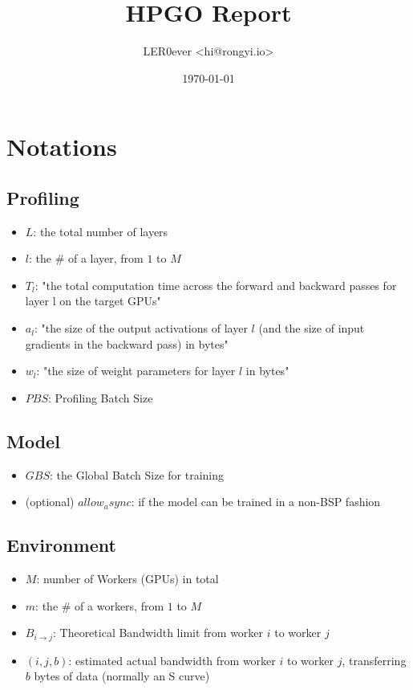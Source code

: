 \documentclass[11pt]{article}
\author{LER0ever <hi@rongyi.io>}
\date{\today}
\title{HPGO Report}
\begin{document}
\maketitle
\tableofcontents

\section{Notations}
\label{sec:org6926016}
\subsection{Profiling}
\label{sec:org769e836}
\begin{itemize}
\item \(L\): the total number of layers
\item \(l\): the \# of a layer, from \(1\) to \(M\)
\item \(T_l\): "the total computation time across the forward and backward passes for layer l on the target GPUs"
\item \(a_l\): "the size of the output activations of layer \(l\) (and the size of input gradients in the backward pass) in bytes"
\item \(w_l\): "the size of weight parameters for layer \(l\) in bytes"
\item \(PBS\): Profiling Batch Size
\end{itemize}
\subsection{Model}
\label{sec:org338d29f}
\begin{itemize}
\item \(GBS\): the Global Batch Size for training
\item (optional) \(allow_async\): if the model can be trained in a non-BSP fashion
\end{itemize}
\subsection{Environment}
\label{sec:orgadc01c3}
\begin{itemize}
\item \(M\): number of Workers (GPUs) in total
\item \(m\): the \# of a workers, from \(1\) to \(M\)
\item \(B_{i \rightarrow j}\): Theoretical Bandwidth limit from worker \(i\) to worker \(j\)
\item \((i,j,b)\): estimated actual bandwidth from worker \(i\) to worker \(j\), transferring \(b\) bytes of data (normally an S curve)
\end{itemize}
\end{document}
